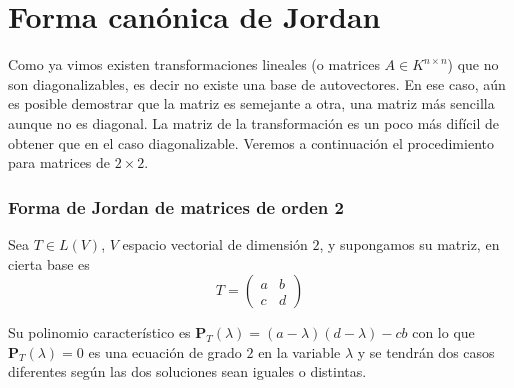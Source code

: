 


\section{Forma canónica de Jordan}
Como ya vimos existen transformaciones lineales (o matrices  $A\in K^{n \times n}$) que no son diagonalizables, es decir no existe una base de autovectores. En ese caso, aún es posible demostrar que la matriz es semejante a otra, una matriz más sencilla aunque no es diagonal. La matriz de la transformación es un poco más difícil de obtener que en el caso diagonalizable.
Veremos a continuación el procedimiento para matrices de $2 \times 2$.




\subsubsection{Forma de Jordan de matrices de orden 2}
Sea $T\in L(V)$, $V$ espacio vectorial de dimensión $2$, y supongamos su matriz, en cierta base es 
$$T=\left(\begin{array}{cc}  a & b  \\ c &  d
\end{array}
\right)$$

\bigskip

Su polinomio característico es $\mathbf{P}_T (\lambda)=(a-\lambda)(d-\lambda)-cb$ con lo que $\mathbf{P}_T(\lambda)=0$ es una ecuación de grado $2$ en la variable $\lambda$ y se tendrán dos casos diferentes  según las dos soluciones sean iguales o distintas.
\bigskip

